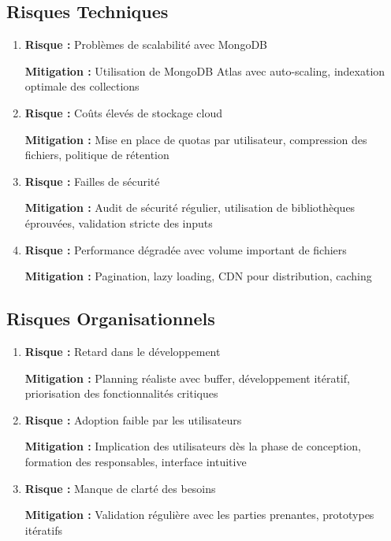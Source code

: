 \documentclass[12pt,a4paper]{article}
\begin{document}
\subsection{Risques Techniques}

\begin{enumerate}[leftmargin=*]
    \item \textbf{Risque :} Problèmes de scalabilité avec MongoDB
    
    \textbf{Mitigation :} Utilisation de MongoDB Atlas avec auto-scaling, indexation optimale des collections
    
    \item \textbf{Risque :} Coûts élevés de stockage cloud
    
    \textbf{Mitigation :} Mise en place de quotas par utilisateur, compression des fichiers, politique de rétention
    
    \item \textbf{Risque :} Failles de sécurité
    
    \textbf{Mitigation :} Audit de sécurité régulier, utilisation de bibliothèques éprouvées, validation stricte des inputs
    
    \item \textbf{Risque :} Performance dégradée avec volume important de fichiers
    
    \textbf{Mitigation :} Pagination, lazy loading, CDN pour distribution, caching
\end{enumerate}

\subsection{Risques Organisationnels}

\begin{enumerate}[leftmargin=*]
    \item \textbf{Risque :} Retard dans le développement
    
    \textbf{Mitigation :} Planning réaliste avec buffer, développement itératif, priorisation des fonctionnalités critiques
    
    \item \textbf{Risque :} Adoption faible par les utilisateurs
    
    \textbf{Mitigation :} Implication des utilisateurs dès la phase de conception, formation des responsables, interface intuitive
    
    \item \textbf{Risque :} Manque de clarté des besoins
    
    \textbf{Mitigation :} Validation régulière avec les parties prenantes, prototypes itératifs
\end{enumerate}
\end{document}
